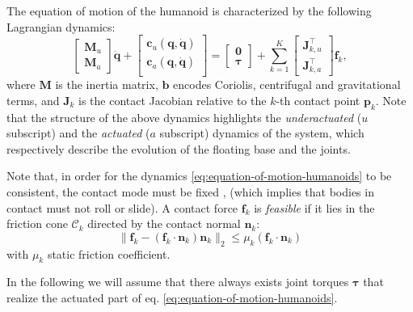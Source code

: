 The equation of motion of the humanoid \cite{Sugihara2020DynamicsofHumanoidRobots}
is characterized by the following Lagrangian dynamics:
\begin{equation}
    \begin{bmatrix}
        \bm{M}_u \\ \bm{M}_a
    \end{bmatrix} \ddot{\bm{q}} +
    \begin{bmatrix}
        \bm{c}_u(\bm{q}, \dot{\bm{q}}) \\
        \bm{c}_a(\bm{q}, \dot{\bm{q}}) \\
    \end{bmatrix} =
    \begin{bmatrix}
        \bm{0} \\ \bm{\tau}
    \end{bmatrix} +
    \sum_{k=1}^{K}
    \begin{bmatrix}
        \bm{J}_{k, u}^\top \\ \bm{J}_{k, a}^\top
    \end{bmatrix}
    \bm{f}_k,
    \label{eq:equation-of-motion-humanoids}
\end{equation}
where $\bm{M}$ is the inertia matrix, $\bm{b}$ encodes Coriolis, centrifugal
and gravitational terms, and $\bm{J}_k$ is the contact Jacobian relative to
the $k$-th contact point $\bm{p}_k$. Note that the structure of the
above dynamics highlights the \textit{underactuated} ($u$ subscript) and
the \textit{actuated} ($a$ subscript)
dynamics of the system, which respectively describe the evolution of the
floating base and the joints.

Note that, in order for the dynamics \eqref{eq:equation-of-motion-humanoids} to
be consistent, the contact mode must be fixed \cite{Balkcom2002Computingwrenchcones},
(which implies that bodies in contact must not roll or slide). A contact force $\bm{f}_k$ is
\textit{feasible} if it lies in the friction cone $\mathcal{C}_k$ directed by
the contact normal $\bm{n}_k$:
\begin{equation}
    \label{eq:feasible-contact-force}
    \| \bm{f}_k - (\bm{f}_k \cdot \bm{n}_k) \bm{n}_k \|_2 \le \mu_k (\bm{f}_k \cdot \bm{n}_k)
\end{equation}
with $\mu_k$ static friction coefficient.

In the following we will assume that there always exists joint torques
$\bm{\tau}$ that realize the actuated part of eq.
\eqref{eq:equation-of-motion-humanoids}.

